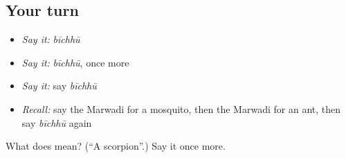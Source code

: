 \subsection*{Your turn}
\begin{itemize}
\raggedright
  \item \emph{Say it:} \emph{bīchhū}
  \item \emph{Say it:} \emph{bīchhū}, once more
  \item \emph{Say it:} say \emph{bīchhū}
  \item \emph{Recall:} say the Marwadi for a mosquito, then the Marwadi for an ant, then say \emph{bīchhū} again
\end{itemize}

\begin{tcolorbox}[breakable,colback=teal!4,colframe=teal!35!black,title={Before you move on}]
What does  mean? (\textquotedblleft{}A scorpion\textquotedblright{}.) Say it once more.
\end{tcolorbox}
